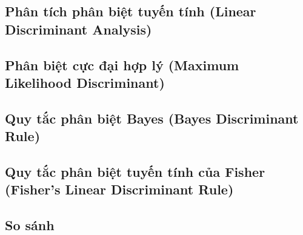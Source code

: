 \documentclass[
  a4paper,
]{article}
\begin{document}
\subsection{Phân tích phân biệt tuyến tính (Linear Discriminant
Analysis)}\label{phuxe2n-tuxedch-phuxe2n-biux1ec7t-tuyux1ebfn-tuxednh-linear-discriminant-analysis}


\subsection{Phân biệt cực đại hợp lý (Maximum Likelihood
Discriminant)}\label{phuxe2n-biux1ec7t-cux1ef1c-ux111ux1ea1i-hux1ee3p-luxfd-maximum-likelihood-discriminant}


\subsection{Quy tắc phân biệt Bayes (Bayes Discriminant
Rule)}\label{quy-tux1eafc-phuxe2n-biux1ec7t-bayes-bayes-discriminant-rule}

\subsection{Quy tắc phân biệt tuyến tính của Fisher (Fisher's Linear
Discriminant
Rule)}\label{quy-tux1eafc-phuxe2n-biux1ec7t-tuyux1ebfn-tuxednh-cux1ee7a-fisher-fishers-linear-discriminant-rule}

\subsection{So sánh}\label{so-suxe1nh}
\end{document}
